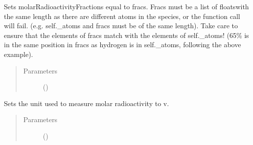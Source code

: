 \documentclass[letterpaper,10pt,openany,oneside,english]{sphinxmanual}
\begin{document}
\begin{fulllineitems}
\begin{fulllineitems}
\begin{quote}
\begin{description}
\end{description}\end{quote}

\end{fulllineitems}


\begin{fulllineitems}
\label{\detokenize{support_rst/specie:specie.Specie.SetMolarRadioactivityFractions}}
Sets molarRadioactivityFractions equal to fracs. Fracs must be a list
of floatswith the same length as there are different atoms in the
species, or the function call will fail. (e.g. self.\_atoms and fracs
must be of the same length). Take care to ensure that the elements of
fracs match with the elements of self.\_atoms! (65\% is in the same
position in fracs as hydrogen is in self.\_atoms, following the above
example).
\begin{quote}\begin{description}
\item[{Parameters}] \leavevmode
{} () \textendash{} 

\end{description}\end{quote}

\end{fulllineitems}


\begin{fulllineitems}
\label{\detokenize{support_rst/specie:specie.Specie.SetMolarRadioactivityUnit}}
Sets the unit used to measure molar radioactivity to v.
\begin{quote}\begin{description}
\item[{Parameters}] \leavevmode
{} () \textendash{} 

\end{description}\end{quote}


\end{fulllineitems}
\end{fulllineitems}
\end{document}
